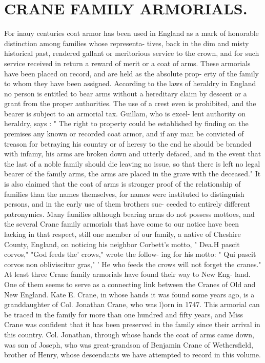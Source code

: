 \documentclass{book}
\begin{document}
\chapter{CRANE FAMILY ARMORIALS.}


For inauy centuries coat armor has been used in England as a 
mark of honorable distinction among families whose representa- 
tives, back in the dim and misty historical past, rendered gallant 
or meritorious service to the crown, and for such service received 
in return a reward of merit or a coat of arms. These armorials 
have been placed on record, and are held as the absolute prop- 
erty of the family to whom they have been assigned. According 
to the laws of heraldry in England no person is entitled to bear 
arms without a hereditary claim by descent or a grant from the 
proper authorities. The use of a crest even is prohibited, and 
the bearer is subject to an armorial tax. Guillam, who is excel- 
lent authority on heraldry, says : " The right to property could be 
established by finding on the premises any known or recorded 
coat armor, and if any man be convicted of treason for betraying 
his country or of heresy to the end he should be branded with 
infamy, his arms are broken down and utterly defaced, and in 
the event that the last of a noble family should die leaving no 
issue, so that there is left no legal bearer of the family arms, the 
arms are placed in the grave with the deceased." It is also 
claimed that the coat of arms is stronger proof of the relationship 
of families than the names themselves, for names were instituted 
to distinguish persons, and in the early use of them brothers suc- 
ceeded to entirely different patronymics. Many families although 
bearing arms do not possess mottoes, and the several Crane family 
armorials that have come to our notice have been lacking in that 
respect, still one member of our family, a native of Cheshire 
County, England, on noticing his neighbor Corbett's motto, 
" Dea.H pascit corvos," "God feeds the' crows," wrote the follow- 
ing for his motto: " Qui pascit corvos non obliviscitur gras," 
' He who feeds the crows will not forget the cranes." At least 
three Crane family armorials have found their way to New Eng- 
land. One of them seems to serve as a connecting link between 
the Cranes of Old and New England. Kate E. Crane, in whose 
hands it was found some years ago, is a granddaughter of Col. 
Jonathan Crane, who was l)orn in 1747. This armorial can be 
traced in the family for more than one hundred and fifty years, 
and Miss Crane was confident that it has been preserved in the 
family since their arrival in this country. Col. Jonathan, through 
whose hands the coat of arms came down, was son of Joseph, 
who was great-grandson of Benjamin Crane of Wethersfield, 
brother of Henry, whose descendants we have attempted to 
record in this volume. 
\end{document}
